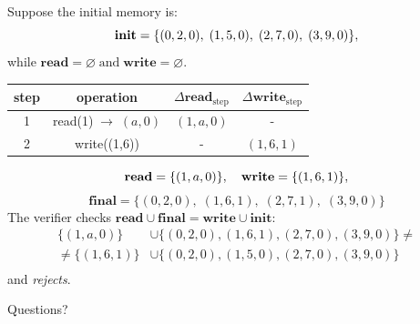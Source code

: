 \documentclass{zkdl-presentation-template}
\begin{document}
    \begin{frame}
        \begin{example}
            Suppose the initial memory is:
            \vspace{-5px}
            \begin{equation*}
                \mathbf{init} =\{(0,2,0), \; (1,5,0), \; (2,7,0), \; (3,9,0)\},
                \vspace{-5px}
            \end{equation*}
            while $\mathbf{read} = \varnothing \; \text{and} \; \mathbf{write} = \varnothing$.

            \pause
            \vspace{6px}
            \begin{center}
                \begin{tabular}{c|c|c|c}
                \textbf{step} & \textbf{operation} & $\Delta\mathbf{read}_{\text{step}}$ & $\Delta\mathbf{write}_{\text{step}}$\\\hline
                1 & read(1)$  \; \to \; (a, 0)$ & $(1,a,0)$ & -        \\
                2 & write((1,6))                & -         & $(1,6,1)$\\
                \end{tabular}
            \end{center}
            \pause
            \vspace{5px}
            \begin{equation*}
                \mathbf{read} = \{(1,a,0)\},\quad
                \mathbf{write} = \{(1,6,1)\},
                \vspace{-5px}
            \end{equation*}
            \begin{equation*}
                \mathbf{final} = \{(0,2,0), \; (1,6,1), \; (2,7,1), \; (3,9,0)\}
            \end{equation*}
            \pause
            The verifier checks $\mathbf{read} \cup \mathbf{final} = \mathbf{write} \cup \mathbf{init}$:
            \vspace{-5px}
            \begin{align*}
                \{(1,a,0)\} &\cup \{(0,2,0), (1,6,1), (2,7,0), (3,9,0)\} \neq \\
                \neq \{(1,6,1)\} &\cup \{(0,2,0), (1,5,0), (2,7,0), (3,9,0)\} \\[-20px]
            \end{align*}
            and \emph{rejects}.
        \end{example}
    \end{frame}

    \begin{frame}
        \centering
        \Huge Questions?
    \end{frame}
\end{document}
